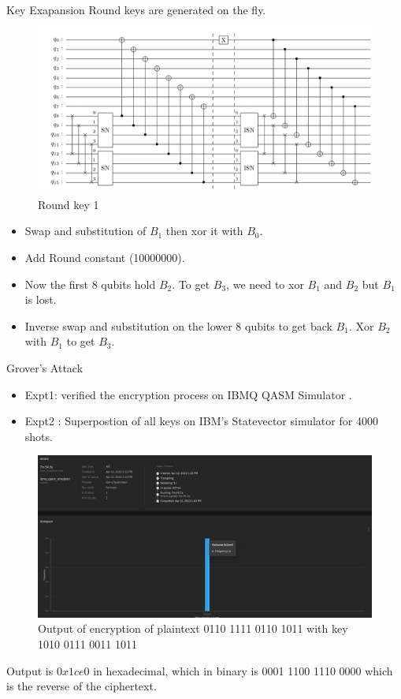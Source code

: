 \begin{frame}{Key Exapansion}
    Round keys are generated on the fly.
    \begin{figure}[h!]
    \centering
    \includegraphics[width=0.8\linewidth]{saes21/r1k.pdf}
    \caption{Round key 1}
    \label{fig:rk121}
\end{figure}
\pause
\begin{itemize}
    \item Swap and substitution of $B_1$ then xor it with $B_0$.
    \pause
    \item Add Round constant (10000000).
    \pause
    \item Now the first 8 qubits hold $B_2$. To get $B_3$, we need to xor $B_1$ and $B_2$ but $B_1$ is lost.
    \pause
    \item Inverse swap and substitution on the lower 8 qubits to get back $B_1$. Xor $B_2$ with $B_1$ to get $B_3$.
    
\end{itemize}
\end{frame}
\begin{frame}{Grover's Attack}
    \begin{itemize}
        \item Expt1:  verified the encryption process on IBMQ QASM Simulator \cite{IBMQ}.
        \pause
        \item Expt2 : Superpostion of all keys on IBM's Statevector simulator for 4000 shots.
    \end{itemize}
    \begin{figure}[h!]
    \centering
    \includegraphics[width=0.7\linewidth]{saes21/encryption.png}
    \caption{Output of encryption of plaintext 0110 1111 0110 1011 with key 1010 0111 0011 1011}
    \label{fig:expt1res}
\end{figure}
Output is $0x1ce0$ in hexadecimal, which in binary is 0001 1100 1110 0000 which is the reverse of the ciphertext.
\end{frame}
